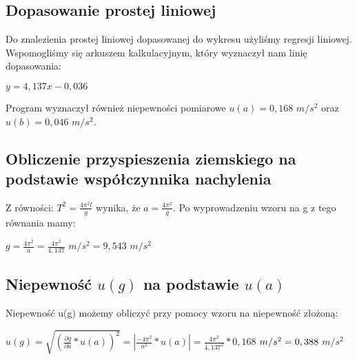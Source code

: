 \documentclass[12pt]{article}
\begin{document}
\subsection{Dopasowanie prostej liniowej}
Do znalezienia prostej liniowej dopasowanej do wykresu użyliśmy regresji liniowej. Wspomogliśmy się arkuszem kalkulacyjnym, który wyznaczył nam linię dopasowania: \newline
\begin{center}
\LARGE $ y = 4,137x - 0,036  $
\end{center}
Program wyznaczył również niepewności pomiarowe $ u(a) = 0,168 $ $m/s^2 $ oraz $ u(b) = 0,046 $ $m/s^2 $. \newpage
\subsection{Obliczenie przyspieszenia ziemskiego na podstawie współczynnika nachylenia}
Z równości: $ T^2 = \frac{4\pi^2{l}}{g} $ wynika, że $ a = \frac{4\pi^2}{g} $. Po wyprowadzeniu wzoru na g z tego równania mamy: 
\begin{center}
\LARGE $ g = \frac{4\pi^2}{a} = \frac{4\pi^2}{4,137} $ $m/s^2 = 9,543 $ $m/s^2 $
\end{center} 
\subsection{Niepewność $u(g)$ na podstawie $u(a)$}
Niepewność u(g) możemy obliczyć przy pomocy wzoru na niepewność złożoną: 
\begin{center}
\LARGE $ u(g) = \sqrt{(\frac{\partial{g}}{\partial{a}}*u(a))^2} =|\frac{-4\pi^2}{a^2}*u(a)| = \frac{4\pi^2}{{4,137}^2}*0,168$ $m/s^2 \newline
 = 	0,388$ $m/s^2$
\end{center}
\end{document}
